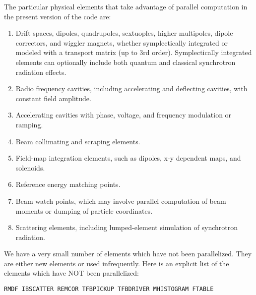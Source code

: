 \documentclass[11pt]{article}
\begin{document}
The particular physical elements that take advantage of parallel computation in the present version of the code are:
\begin{enumerate}

\item Drift spaces, dipoles, quadrupoles, sextuoples, higher
multipoles, dipole correctors, and wiggler magnets, whether
symplectically integrated or modeled with a transport matrix (up to
3rd order).  Symplectically integrated elements can optionally include
both quantum and classical synchrotron radiation effects.

\item Radio frequency cavities, including accelerating and deflecting cavities, with constant field amplitude.

\item Accelerating cavities with phase, voltage, and frequency modulation or ramping.

\item Beam collimating and scraping elements.

\item Field-map integration elements, such as dipoles, x-y dependent maps, and solenoids.

\item Reference energy matching points.

\item Beam watch points, which may involve parallel computation of beam moments or dumping of particle coordinates.

\item Scattering elements, including lumped-element simulation of synchrotron radiation.\\
\end{enumerate}


\noindent 
We have a very small number of elements which have not been parallelized. They are either new elements or used infrequently. Here is an explicit list of the elements which have NOT been parallelized:
\begin{verbatim}
RMDF IBSCATTER REMCOR TFBPICKUP TFBDRIVER MHISTOGRAM FTABLE
\end{verbatim}
\end{document}
